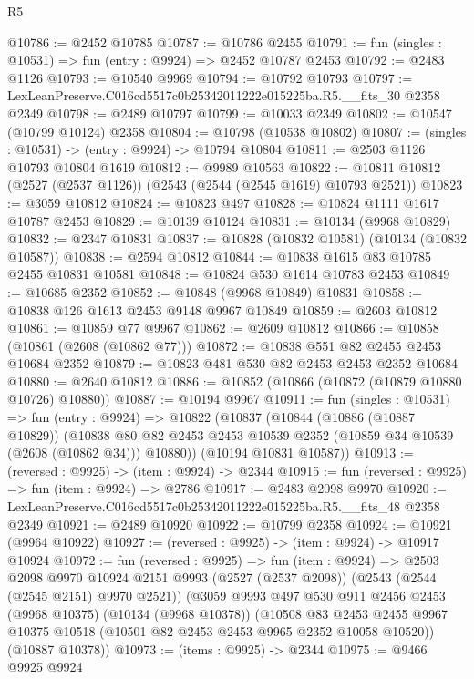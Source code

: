 \begin{lexlean}{R5}
\begin{coremodule}
@10786 := @2452 @10785
@10787 := @10786 @2455
@10791 := fun (singles : @10531) => fun (entry : @9924) => @2452 @10787 @2453
@10792 := @2483 @1126
@10793 := @10540 @9969
@10794 := @10792 @10793
@10797 := LexLeanPreserve.C016cd5517c0b25342011222e015225ba.R5.__fits_30 @2358 @2349
@10798 := @2489 @10797
@10799 := @10033 @2349
@10802 := @10547 (@10799 @10124) @2358
@10804 := @10798 (@10538 @10802)
@10807 := (singles : @10531) -> (entry : @9924) -> @10794 @10804
@10811 := @2503 @1126 @10793 @10804 @1619
@10812 := @9989 @10563
@10822 := @10811 @10812 (@2527 (@2537 @1126)) (@2543 (@2544 (@2545 @1619) @10793 @2521))
@10823 := @3059 @10812
@10824 := @10823 @497
@10828 := @10824 @1111 @1617 @10787 @2453
@10829 := @10139 @10124
@10831 := @10134 (@9968 @10829)
@10832 := @2347 @10831
@10837 := @10828 (@10832 @10581) (@10134 (@10832 @10587))
@10838 := @2594 @10812
@10844 := @10838 @1615 @83 @10785 @2455 @10831 @10581
@10848 := @10824 @530 @1614 @10783 @2453
@10849 := @10685 @2352
@10852 := @10848 (@9968 @10849) @10831
@10858 := @10838 @126 @1613 @2453 @9148 @9967 @10849
@10859 := @2603 @10812
@10861 := @10859 @77 @9967
@10862 := @2609 @10812
@10866 := @10858 (@10861 (@2608 (@10862 @77)))
@10872 := @10838 @551 @82 @2455 @2453 @10684 @2352
@10879 := @10823 @481 @530 @82 @2453 @2453 @2352 @10684
@10880 := @2640 @10812
@10886 := @10852 (@10866 (@10872 (@10879 @10880 @10726) @10880))
@10887 := @10194 @9967
@10911 := fun (singles : @10531) =>
  fun (entry : @9924) =>
  @10822
    (@10837
      (@10844
        (@10886 (@10887 @10829))
        (@10838 @80 @82 @2453 @2453 @10539 @2352 (@10859 @34 @10539 (@2608 (@10862 @34))) @10880))
      (@10194 @10831 @10587))
@10913 := (reversed : @9925) -> (item : @9924) -> @2344
@10915 := fun (reversed : @9925) => fun (item : @9924) => @2786
@10917 := @2483 @2098 @9970
@10920 := LexLeanPreserve.C016cd5517c0b25342011222e015225ba.R5.__fits_48 @2358 @2349
@10921 := @2489 @10920
@10922 := @10799 @2358
@10924 := @10921 (@9964 @10922)
@10927 := (reversed : @9925) -> (item : @9924) -> @10917 @10924
@10972 := fun (reversed : @9925) =>
  fun (item : @9924) =>
  @2503
    @2098
    @9970
    @10924
    @2151
    @9993
    (@2527 (@2537 @2098))
    (@2543 (@2544 (@2545 @2151) @9970 @2521))
    (@3059
      @9993
      @497
      @530
      @911
      @2456
      @2453
      (@9968 @10375)
      (@10134 (@9968 @10378))
      (@10508
        @83
        @2453
        @2455
        @9967
        @10375
        @10518
        (@10501 @82 @2453 @2453 @9965 @2352 @10058 @10520))
      (@10887 @10378))
@10973 := (items : @9925) -> @2344
@10975 := @9466 @9925 @9924

\end{coremodule}
\end{lexlean}
